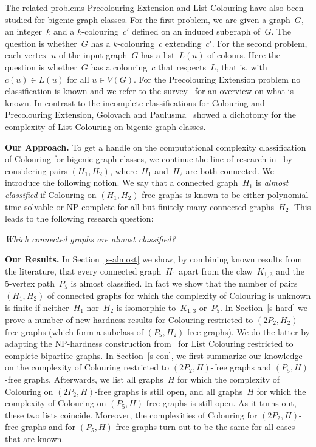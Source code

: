 \documentclass{llncs}
\newcommand{\NP}{{\sf NP}}
\begin{document}
The related problems {\sc Precolouring Extension} and {\sc List Colouring} have also been studied for bigenic graph classes.
For the first problem, we are given a graph~$G$, an integer~$k$ and a $k$-colouring~$c'$ defined on an induced subgraph of~$G$.
The question is whether~$G$ has a $k$-colouring~$c$ extending~$c'$.
For the second problem, each vertex~$u$ of the input graph~$G$ has a list~$L(u)$ of colours.
Here the question is whether~$G$ has a colouring~$c$ that respects~$L$, that is, with $c(u)\in L(u)$ for all $u\in V(G)$.
For the {\sc Precolouring Extension} problem no classification is known and we refer to the survey~\cite{GJPS} for an overview on what is known.
In contrast to the incomplete classifications for {\sc Colouring} and {\sc Precolouring Extension}, Golovach and Paulusma~\cite{GP14} showed a dichotomy for
the complexity of {\sc List Colouring} on bigenic graph classes.

\medskip
\noindent
{\bf Our Approach.}
To get a handle on the computational complexity classification of {\sc Colouring} for bigenic graph classes, we continue the line of research in~\cite{BBKRS05,HL,KMP,Ma13,Ma,ML17} by considering pairs $(H_1,H_2)$, where~$H_1$ and~$H_2$ are both connected.
We introduce the following notion.
We say that a connected graph~$H_1$ is {\em almost classified} if {\sc Colouring} on $(H_1,H_2)$-free graphs is known to be either polynomial-time solvable or \NP-complete for all but finitely many connected graphs~$H_2$.
This leads to the following research question:
\begin{center}
{\em Which connected graphs are almost classified?}
\end{center}

\medskip
\noindent
{\bf Our Results.}
In Section~\ref{s-almost} we show, by combining known results from the literature, that every connected graph~$H_1$ apart from the claw~$K_{1,3}$ and the $5$-vertex path~$P_5$ is almost classified.
In fact we show that the number of pairs $(H_1,H_2)$ of connected graphs for which the complexity of {\sc Colouring} is unknown is finite if neither~$H_1$ nor~$H_2$ is isomorphic to~$K_{1,3}$ or~$P_5$.
In Section~\ref{s-hard} we prove a number of new hardness results for {\sc Colouring} restricted to $(2P_2,H_2)$-free graphs (which form a subclass of $(P_5,H_2)$-free graphs).
We do the latter by adapting the \NP-hardness construction from~\cite{GH09} for {\sc List Colouring} restricted to complete bipartite graphs.
In Section~\ref{s-con}, we first summarize our knowledge on the complexity of {\sc Colouring} restricted to $(2P_2,H)$-free graphs and $(P_5,H)$-free graphs.
Afterwards, we list all graphs~$H$ for which the complexity of {\sc Colouring} on $(2P_2,H)$-free graphs is still open, and all graphs~$H$ for which the complexity of {\sc Colouring} on $(P_5,H)$-free graphs is still open.
As it turns out, these two lists coincide.
Moreover, the complexities of {\sc Colouring} for $(2P_2,H)$-free graphs and for $(P_5,H)$-free graphs turn out to be the same for all cases that are known.
\end{document}
